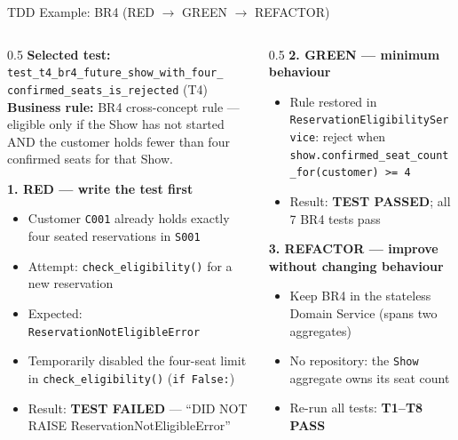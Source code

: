 \documentclass[aspectratio=169,11pt]{beamer}
\newcommand{\code}[1]{\texttt{#1}}
\begin{document}
\begin{frame}{TDD Example: BR4 (RED $\rightarrow$ GREEN $\rightarrow$ REFACTOR)}
  \begin{columns}[t]
    \begin{column}{0.5\textwidth}
      \scriptsize
      \textbf{Selected test:} \code{test\_t4\_br4\_future\_show\_with\_four\_%
      confirmed\_seats\_is\_rejected} (T4)\\
      \textbf{Business rule:} BR4 cross-concept rule --- eligible only if the
      Show has not started AND the customer holds fewer than four confirmed
      seats for that Show.
      \vspace{0.15cm}

      \textbf{1. RED --- write the test first}
      \begin{itemize}
        \item Customer \code{C001} already holds exactly four seated
              reservations in \code{S001}
        \item Attempt: \code{check\_eligibility()} for a new reservation
        \item Expected: \code{ReservationNotEligibleError}
        \item Temporarily disabled the four-seat limit in
              \code{check\_eligibility()} (\code{if False:})
        \item Result: \textbf{TEST FAILED} ---
              ``DID NOT RAISE ReservationNotEligibleError''
      \end{itemize}
    \end{column}
    \begin{column}{0.5\textwidth}
      \scriptsize
      \textbf{2. GREEN --- minimum behaviour}
      \begin{itemize}
        \item Rule restored in \code{ReservationEligibilityService}: reject
              when \code{show.confirmed\_seat\_count\_for(customer) >= 4}
        \item Result: \textbf{TEST PASSED}; all 7 BR4 tests pass
      \end{itemize}

      \textbf{3. REFACTOR --- improve without changing behaviour}
      \begin{itemize}
        \item Keep BR4 in the stateless Domain Service (spans two aggregates)
        \item No repository: the \code{Show} aggregate owns its seat count
        \item Re-run all tests: \textbf{T1--T8 PASS}
      \end{itemize}


\end{column}
\end{columns}
\end{frame}
\end{document}
